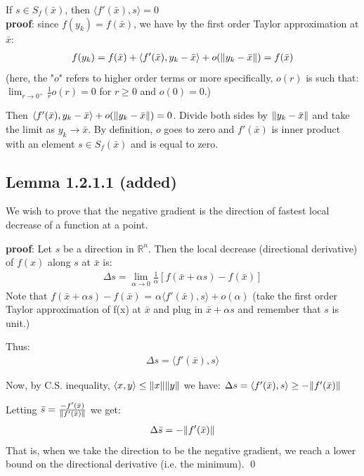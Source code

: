 \documentclass[12pt,a4paper]{article}
\begin{document}
	If $s \in S_f(\bar{x})$, then $\langle f'(\bar{x}), s \rangle = 0$ \\
	\textbf{proof}:  since $f(y_k) = f(\bar{x})$, we have by the first order Taylor approximation at $\bar{x}$:
	\begin{align*}
		f(y_k) = f(\bar{x}) + \langle f'(\bar{x}), y_k - \bar{x} \rangle + o(\norm{y_k - \bar{x}}) = f(\bar{x})
	\end{align*}
	(here, the "$o$" refers to higher order terms or more specifically, $o(r)$ is such that: $\lim_{r\rightarrow 0^+} \frac{1}{r}o(r) = 0$ for $r \geq 0$ and $o(0) = 0$.)
	
	Then $ \langle f'(\bar{x}), y_k - \bar{x} \rangle + o(\norm{y_k - \bar{x}}) = 0$. Divide both sides by $\norm{y_k - \bar{x}}$ and take the limit as $y_k \rightarrow \bar{x}$. By definition, $o$ goes to zero and $f'(\bar{x})$ is inner product with an element $s\in S_f(\bar{x})$ and is equal to zero. 
	
	\subsection*{Lemma 1.2.1.1 (added)}\label{lem1211}
	We wish to prove that the negative gradient is the direction of fastest local decrease of a function at a point.
	
	\textbf{proof}: Let $s$ be a direction in $\mathbb{R}^n$. Then the local decrease (directional derivative) of $f(x)$ along $s$ at $\bar{x}$ is:
	\begin{align*}
		\Delta{s} = \lim_{\alpha \rightarrow 0} \frac{1}{\alpha}[f(\bar{x} + \alpha s) - f(\bar{x})]
	\end{align*}
	Note that $f(\bar{x} + \alpha s) - f(\bar{x})$ = $\alpha \langle f'(\bar{x}), s \rangle + o(\alpha)$ 
	(take the first order Taylor approximation of f(x) at $\bar{x}$ and plug in $\bar{x} +  \alpha s$ and remember that $s$ is unit.)
	
	Thus:
	\begin{align*}
		\Delta s = \langle f'(\bar{x}), s \rangle 
	\end{align*}
	
	Now, by C.S. inequality, $\langle x, y \rangle \leq \norm{x} \norm{y}$ we have:
	$\Delta s = \langle f'(\bar{x}), s \rangle \geq - \norm{f'(\bar{x})}$
	
	Letting $\bar{s} = \frac{-f'(\bar{x})}{\norm{f'(\bar{x})}}$ we get:
	\begin{align*}
		\Delta \bar{s} = - \norm{f'(\bar{x})}
	\end{align*}
	That is, when we take the direction to be the negative gradient, we reach a lower bound on the directional derivative (i.e. the minimum). \qed 
	
\end{document}

